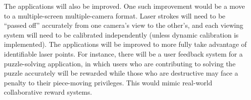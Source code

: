 The applications will also be improved. One such improvement would be a move to a multiple-screen multiple-camera format. Laser strokes will need to be ``passed off'' accurately from one camera's view to the other's, and each viewing system will need to be calibrated independently (unless dynamic calibration is implemented). The applications will be improved to more fully take advantage of identifiable laser points. For instance, there will be a user feedback system for a puzzle-solving application, in which users who are contributing to solving the puzzle accurately will be rewarded while those who are destructive may face a penalty to their piece-moving privileges. This would mimic real-world collaborative reward systems.

